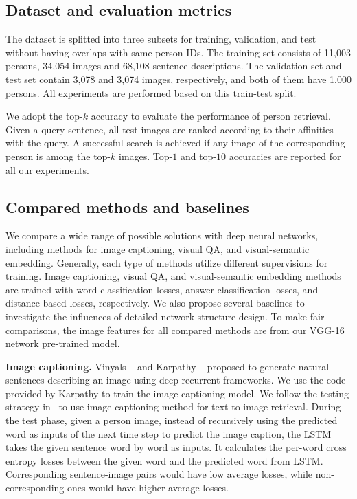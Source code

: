 \subsection{Dataset and evaluation metrics}
\label{exp:dataset}
The dataset is splitted into three subsets for training, validation, and test without having overlaps with same person IDs. The training set consists of 11,003 persons, 34,054 images and 68,108 sentence descriptions. The validation set and test set contain 3,078 and 3,074 images, respectively, and both of them have 1,000 persons. All experiments are performed based on this train-test split.

We adopt the top-$k$ accuracy to evaluate the performance of person retrieval. Given a query sentence, all test images are ranked according to their affinities with the query. A successful search is achieved if any image of the corresponding person is among the top-$k$ images. Top-$1$ and top-$10$ accuracies are reported for all our experiments.



\subsection{Compared methods and baselines}
\label{exp:baseline}

We compare a wide range of possible solutions with deep neural networks, including methods for image captioning, visual QA, and visual-semantic embedding. 
Generally, each type of methods utilize different supervisions for training. Image captioning, visual QA, and visual-semantic embedding methods are trained with word classification losses, answer classification losses, and distance-based losses, respectively.
We also propose several baselines to investigate the influences of detailed network structure design. To make fair comparisons, the image features for all compared methods are from our VGG-16 network pre-trained model.

\textbf{Image captioning.}
Vinyals \etal~\cite{vinyals2015show} and Karpathy \etal~\cite{karpathy2015deep} proposed to generate natural sentences describing an image using deep recurrent frameworks. We use the code provided by Karpathy \etal to train the image captioning model. We follow the testing strategy in~\cite{hu2015natural} to use image captioning method for text-to-image retrieval.
During the test phase, given a person image, instead of recursively using the predicted word as inputs of the next time step to predict the image caption, the LSTM takes the given sentence word by word as inputs. It calculates the per-word cross entropy losses between the given word and the predicted word from LSTM. Corresponding sentence-image pairs would have low average losses, while non-corresponding ones would have higher average losses.


